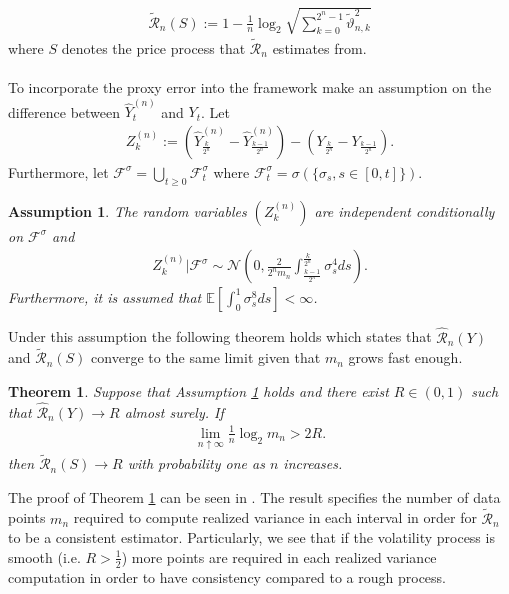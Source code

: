 \documentclass{article}
\newtheorem{theorem}{Theorem}
\newtheorem{assumption}{Assumption}
\begin{document}
\begin{align*}
\widetilde{\mathscr{R}}_n (S) := 1 - \frac{1}{n}\log_2 \sqrt{\sum_{k=0}^{2^n-1}\widetilde{\vartheta}_{n,k}^2}
\end{align*}
where $S$ denotes the price process that $\widetilde{\mathscr{R}}_n$ estimates from. \\\\
To incorporate the proxy error into the framework \cite{han} make an assumption on the difference between $\widehat{Y}_t^{(n)}$ and $Y_t$. Let 
\begin{align*}
Z_k^{(n)} := \left( \widehat{Y}_{\frac{k}{2^{n}}}^{(n)} - \widehat{Y}_{\frac{k-1}{2^{n}}}^{(n)} \right) - \left( Y_{\frac{k}{2^{n}}} - Y_{\frac{k-1}{2^{n}}} \right).
\end{align*}
Furthermore, let $\mathscr{F}^\sigma = \bigcup_{t\geq 0} \mathscr{F}^\sigma_t$ where $\mathscr{F}^\sigma_t = \sigma \left( \{ \sigma_s, s\in [0,t]\}\right)$. 
\begin{assumption}
The random variables $\left( Z_k^{(n)} \right) $ are independent conditionally on $\mathscr{F}^\sigma$ and
\begin{align*}
Z_k^{(n)}\vert \mathscr{F}^\sigma \sim \mathcal{N}\left( 0, \frac{2}{2^n m_n}\int_\frac{k-1}{2^n}^\frac{k}{2^n} \sigma_s^4 ds \right).
\end{align*}
Furthermore, it is assumed that $\mathbb{E}[\int_0^1 \sigma_s^8 ds]<\infty$. \label{as:onlyone}
\end{assumption}
Under this assumption the following theorem holds which states that $\hat{\mathscr{R}}_n (Y)$ and $\widetilde{\mathscr{R}}_n (S)$ converge to the same limit given that $m_n$ grows fast enough.
\begin{theorem}
Suppose that Assumption \ref{as:onlyone} holds and there exist $R\in (0,1)$ such that $\hat{\mathscr{R}}_n (Y)\rightarrow R$ almost surely. If 
\begin{align*}
\lim_{n\uparrow \infty} \frac{1}{n}\log_2 m_n> 2R.
\end{align*} 
then $\widetilde{\mathscr{R}}_n (S)\rightarrow R$ with probability one as $n$ increases. \label{thm:onlyone}
\end{theorem}
The proof of Theorem \ref{thm:onlyone} can be seen in \cite{han}. The result specifies the number of data points $m_n$ required to compute realized variance in each interval in order for $\widetilde{\mathscr{R}}_n$ to be a consistent estimator. Particularly, we see that if the volatility process is smooth (i.e. $R> \frac{1}{2}$) more points are required in each realized variance computation in order to have consistency compared to a rough process. \\\\
\end{document}
